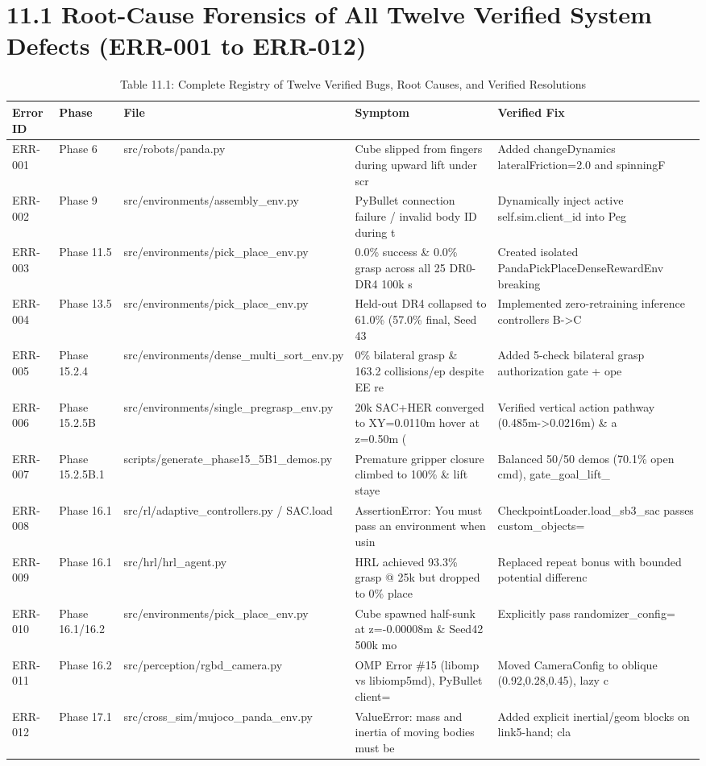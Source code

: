 \documentclass[11pt,a4paper,oneside]{book}
\begin{document}
\section{11.1 Root-Cause Forensics of All Twelve Verified System Defects (ERR-001 to ERR-012)}
\begin{longtable}{l l l l l}\caption{Table 11.1: Complete Registry of Twelve Verified Bugs, Root Causes, and Verified Resolutions}\\\toprule
Error ID & Phase & File & Symptom & Verified Fix \\ \midrule \endhead
ERR-001 & Phase 6 & src/robots/panda.py & Cube slipped from fingers during upward lift under scr & Added changeDynamics lateralFriction=2.0 and spinningF \\
ERR-002 & Phase 9 & src/environments/assembly\_env.py & PyBullet connection failure / invalid body ID during t & Dynamically inject active self.sim.client\_id into Peg  \\
ERR-003 & Phase 11.5 & src/environments/pick\_place\_env.py & 0.0\% success \& 0.0\% grasp across all 25 DR0-DR4 100k s & Created isolated PandaPickPlaceDenseRewardEnv breaking \\
ERR-004 & Phase 13.5 & src/environments/pick\_place\_env.py & Held-out DR4 collapsed to 61.0\% (57.0\% final, Seed 43  & Implemented zero-retraining inference controllers B->C \\
ERR-005 & Phase 15.2.4 & src/environments/dense\_multi\_sort\_env.py & 0\% bilateral grasp \& 163.2 collisions/ep despite EE re & Added 5-check bilateral grasp authorization gate + ope \\
ERR-006 & Phase 15.2.5B & src/environments/single\_pregrasp\_env.py & 20k SAC+HER converged to XY=0.0110m hover at z=0.50m ( & Verified vertical action pathway (0.485m->0.0216m) \& a \\
ERR-007 & Phase 15.2.5B.1 & scripts/generate\_phase15\_5B1\_demos.py & Premature gripper closure climbed to 100\% \& lift staye & Balanced 50/50 demos (70.1\% open cmd), gate\_goal\_lift\_ \\
ERR-008 & Phase 16.1 & src/rl/adaptive\_controllers.py / SAC.load & AssertionError: You must pass an environment when usin & CheckpointLoader.load\_sb3\_sac passes custom\_objects={' \\
ERR-009 & Phase 16.1 & src/hrl/hrl\_agent.py & HRL achieved 93.3\% grasp @ 25k but dropped to 0\% place & Replaced repeat bonus with bounded potential differenc \\
ERR-010 & Phase 16.1/16.2 & src/environments/pick\_place\_env.py & Cube spawned half-sunk at z=-0.00008m \& Seed42 500k mo & Explicitly pass randomizer\_config={'enabled': True, .. \\
ERR-011 & Phase 16.2 & src/perception/rgbd\_camera.py & OMP Error \#15 (libomp vs libiomp5md), PyBullet client= & Moved CameraConfig to oblique (0.92,0.28,0.45), lazy c \\
ERR-012 & Phase 17.1 & src/cross\_sim/mujoco\_panda\_env.py & ValueError: mass and inertia of moving bodies must be  & Added explicit inertial/geom blocks on link5-hand; cla \\
\bottomrule \end{longtable}
\end{document}
